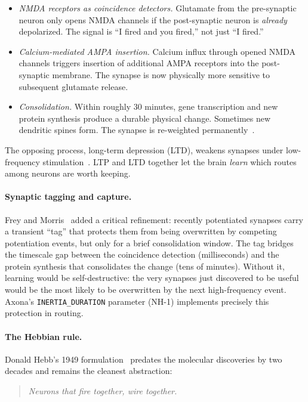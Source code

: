 \documentclass[conference]{IEEEtran}
\newcommand{\axona}{Axona\xspace}
\newcommand{\nhone}{NH-1\xspace}
\begin{document}
\begin{itemize}
\item \emph{NMDA receptors as coincidence detectors.} Glutamate from the
pre-synaptic neuron only opens NMDA channels if the post-synaptic
neuron is \emph{already} depolarized. The signal is ``I fired and you
fired,'' not just ``I fired.''
\item \emph{Calcium-mediated AMPA insertion.} Calcium influx through
opened NMDA channels triggers insertion of additional AMPA receptors
into the post-synaptic membrane. The synapse is now physically more
sensitive to subsequent glutamate release.
\item \emph{Consolidation.} Within roughly $30$ minutes, gene
transcription and new protein synthesis produce a durable physical
change. Sometimes new dendritic spines form. The synapse is
re-weighted permanently~\cite{bear2020neuroscience}.
\end{itemize}

\noindent
The opposing process, long-term depression (LTD), weakens synapses
under low-frequency stimulation~\cite{stanton1989associative}. LTP and
LTD together let the brain \emph{learn} which routes among neurons are
worth keeping.

\paragraph{Synaptic tagging and capture.}
Frey and Morris~\cite{frey1997synaptic} added a critical refinement:
recently potentiated synapses carry a transient ``tag'' that protects
them from being overwritten by competing potentiation events, but only
for a brief consolidation window. The tag bridges the timescale gap
between the coincidence detection (milliseconds) and the protein
synthesis that consolidates the change (tens of minutes). Without it,
learning would be self-destructive: the very synapses just discovered
to be useful would be the most likely to be overwritten by the next
high-frequency event. \axona's \texttt{INERTIA\_DURATION} parameter
(\nhone) implements precisely this protection in routing.

\paragraph{The Hebbian rule.}
Donald Hebb's 1949 formulation~\cite{hebb1949organization} predates
the molecular discoveries by two decades and remains the cleanest
abstraction:

\begin{quote}
\emph{Neurons that fire together, wire together.}
\end{quote}
\end{document}
